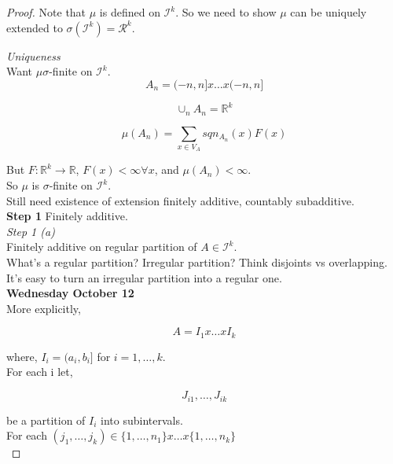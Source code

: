 \documentclass[11pt,fleqn]{book} %
\begin{document}
\begin{proof}
	Note that $\mu$ is defined on $\mathcal{I}^k$. So we need to show $\mu$ can be uniquely extended to $\sigma(\mathcal{I}^k) = \mathcal{R}^k$. 

	\textit{Uniqueness}\\

	Want $\mu \sigma$-finite on $\mathcal{I}^k$. \\

			$$ A_n = (-n, n] x \dots x (-n, n] $$

			$$ \cup_n A_n = \mathbb{R}^k $$

			$$\mu(A_n) = \sum_{x \in V_A} sqn_{A_n} (x) F(x)  $$

	But  $F: \mathbb{R}^k \rightarrow \mathbb{R}$, $F(x) < \infty \forall x$, and $\mu(A_n) < \infty$. \\

	So $\mu $ is $\sigma$-finite on $\mathcal{I}^k$.\\

	Still need existence of extension finitely additive, countably subadditive. \\

	\textbf{Step 1} Finitely additive. \\

		\textit{Step 1 (a)}\\


		Finitely additive on regular partition of $A \in \mathcal{I}^k$.\\

		What's a regular partition? Irregular partition? Think disjoints vs overlapping. \\

		It's easy to turn an irregular partition into a regular one. \\

\textbf{Wednesday October 12}\\

		More explicitly, 

				$$A = I_1 x \dots x I_k $$

		where, $I_i =  (a_i, b_i] $ for $ i = 1, \dots, k$.\\

		For each i let, 

				$$ J_{i1}, \dots, J_{ik}$$ 

		be a partition of $I_i $ into subintervals.  \\


		For each $(j_1, \dots, j_k) \in \{1, \dots, n_1 \} x \dots x \{1, \dots, n_k\}$\\


\end{proof}
\end{document}
